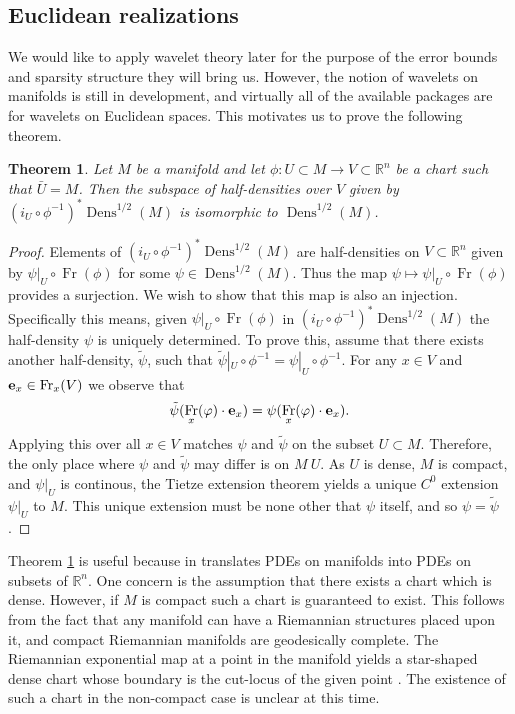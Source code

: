 \documentclass[letterpaper, 10 pt, conference]{ieeeconf}
\newtheorem{thm}{Theorem}[section]
\DeclareMathOperator{\Fr}{Fr}
\DeclareMathOperator{\Dens}{Dens}
\begin{document}
\subsection{Euclidean realizations}
\label{sec:euclidean}
We would like to apply wavelet theory later for the purpose of the
error bounds and sparsity structure they will bring us.
However, the notion of wavelets on manifolds is still in development,
and virtually all of the available packages are for wavelets on
Euclidean spaces.
This motivates us to prove the following theorem.

\begin{thm} \label{thm:global_chart}
  Let $M$ be a manifold and let
  $\phi:U \subset M \to V \subset \mathbb{R}^n$
  be a chart such that $\bar{U} = M$.
  Then the subspace of half-densities over $V$ given by
  $(i_U \circ \phi^{-1})^* \Dens^{1/2}(M)$ is isomorphic
  to $\Dens^{1/2}(M)$.
\end{thm}
\begin{proof}
  Elements of $(i_U \circ \phi^{-1})^* \Dens^{1/2}(M)$
  are half-densities on $V \subset \mathbb{R}^n$ given by
  $ \left. \psi \right|_{U} \circ \Fr(\phi)$ for some
  $\psi \in \Dens^{1/2}(M)$.
  Thus the map $\psi \mapsto \psi|_U \circ \Fr(\phi)$
  provides a surjection.
  We wish to show that this map is also an injection.
  Specifically this means, given 
  $\left. \psi \right|_{U} \circ \Fr(\phi)$ in
  $(i_U \circ \phi^{-1})^*\Dens^{1/2}(M)$ the half-density $\psi$ is
  uniquely determined.
  To prove this, assume that there exists another half-density,
  $\tilde{\psi}$, such that
  $\tilde{\psi}|_U \circ \phi^{-1} = \psi|_U \circ \phi^{-1}$.
  For any $x \in V$ and ${\bf e}_x \in \Fr_x(V)$ we observe that
  \begin{align*}
    \tilde{\psi}( \Fr_x(\varphi) \cdot {\bf e}_x) =
    \psi( \Fr_x( \varphi) \cdot {\bf e}_x).
  \end{align*}
  Applying this over all $x \in V$ matches $\psi$ and $\tilde{\psi}$ on
  the subset $U \subset M$.
  Therefore, the only place where $\psi$ and $\tilde{\psi}$ may differ 
  is on $M \ U$.
  As $U$ is dense, $M$ is compact, and $\psi|_U$ is continous,
  the Tietze extension theorem yields a unique $C^0$ extension
  $\psi|_U$ to $M$.  This unique extension must be none other
  that $\psi$ itself, and so $\psi = \tilde{\psi}$.
\end{proof}

  Theorem \ref{thm:global_chart} is useful because in translates
  PDEs on manifolds into PDEs on subsets of $\mathbb{R}^n$.
  One concern is the assumption that there exists a chart which
  is dense.  However, if $M$ is compact such a chart is guaranteed
  to exist.  This follows from the fact that any manifold can have
  a Riemannian structures placed upon it, and compact Riemannian
  manifolds are geodesically complete.
  The Riemannian exponential map at a point in the manifold
  yields a star-shaped dense chart whose boundary is the cut-locus
  of the given point \cite{Sakai1996}.
  The existence of such a chart in the non-compact case is unclear
  at this time.
\end{document}
